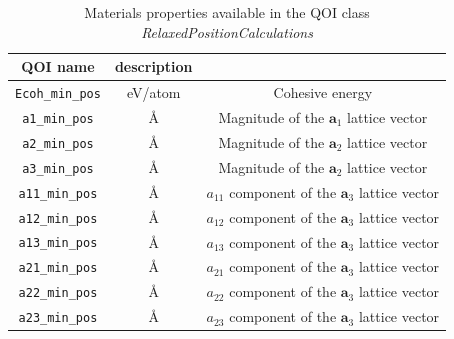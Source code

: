 \begin{table}[p]
	\centering
	\caption{Materials properties available in the QOI class \emph{RelaxedPositionCalculations}}
	\label{tbl:pypospack_qoi_lmps_min_pos}
	\begin{tabular}{ccc}
		\hline
		QOI name & description \\
		\hline
		\verb|Ecoh_min_pos|
			& eV/atom
			& Cohesive energy\\
    \verb|a1_min_pos|
		  & \AA
			& Magnitude of the $\bm{a}_1$ lattice vector \\
		\verb|a2_min_pos|
			& \AA
			& Magnitude of the $\bm{a}_2$ lattice vector \\
		\verb|a3_min_pos|
			& \AA
			& Magnitude of the $\bm{a}_2$ lattice vector \\
    \verb|a11_min_pos|
			& \AA
			& $a_{11}$ component of the $\bm{a}_3$ lattice vector \\
		\verb|a12_min_pos|
			& \AA
			& $a_{12}$ component of the $\bm{a}_3$ lattice vector \\
		\verb|a13_min_pos|
			& \AA
			& $a_{13}$ component of the $\bm{a}_3$ lattice vector \\
    \verb|a21_min_pos|
			& \AA
			& $a_{21}$ component of the $\bm{a}_3$ lattice vector \\
		\verb|a22_min_pos|
			& \AA
			& $a_{22}$ component of the $\bm{a}_3$ lattice vector \\
		\verb|a23_min_pos|
			& \AA
			& $a_{23}$ component of the $\bm{a}_3$ lattice vector \\
		\hline
	\end{tabular}
\end{table}

